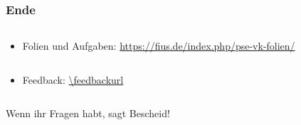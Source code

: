\begin{frame}[fragile]
    \frametitle{Ende}
    \begin{columns}
        \begin{column}{0.65\textwidth}
            \begin{itemize}
                \item Folien und Aufgaben: \newline \url{https://fius.de/index.php/pse-vk-folien/}
            \end{itemize}
        \end{column}
        \begin{column}{0.35\textwidth}
        \end{column}
    \end{columns}

    \vspace{3em}

    \begin{columns}
        \begin{column}{0.65\textwidth}
            \begin{itemize}
                \item Feedback: \newline \url{\feedbackurl}
            \end{itemize}
        \end{column}
        \begin{column}{0.35\textwidth}
            \qrcode{\feedbackurl}
        \end{column}
    \end{columns}

    Wenn ihr Fragen habt, sagt Bescheid!

\end{frame}